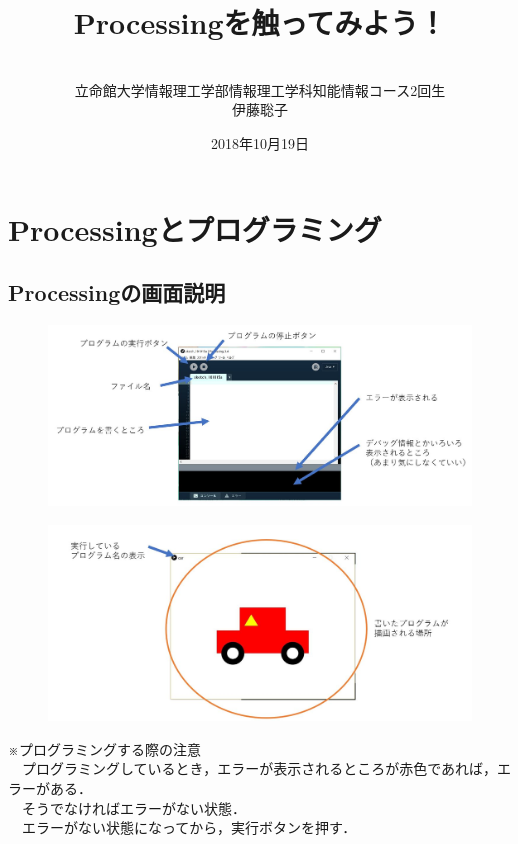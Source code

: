 \documentclass[a4j]{jarticle}
\begin{document}
%
%
\begin{titlepage}
\title{Processingを触ってみよう！}
\author{
\\
立命館大学情報理工学部情報理工学科知能情報コース2回生\\
伊藤聡子　
\\
}
\date{2018年10月19日}
\maketitle
\thispagestyle{empty}
\newpage
\end{titlepage}


%
%
\section{Processingとプログラミング}
\subsection{Processingの画面説明}
\begin{figure}[h]
\includegraphics[width=17cm]{processing.JPG}
\end{figure}
\begin{figure}[h]
\includegraphics[width=17cm]{ProcessingJ.JPG}
\end{figure}
※プログラミングする際の注意\\
　プログラミングしているとき，エラーが表示されるところが赤色であれば，エラーがある．\\
　そうでなければエラーがない状態．\\
　エラーがない状態になってから，実行ボタンを押す．
\end{document}

